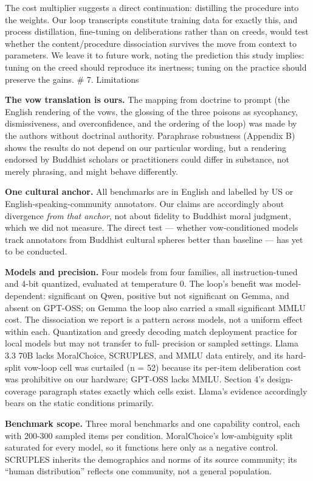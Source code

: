 \documentclass[
  11pt,
]{article}
\begin{document}
The cost multiplier suggests a direct continuation: distilling the
procedure into the weights. Our loop transcripts constitute training
data for exactly this, and process distillation, fine-tuning on
deliberations rather than on creeds, would test whether the
content/procedure dissociation survives the move from context to
parameters. We leave it to future work, noting the prediction this study
implies: tuning on the creed should reproduce its inertness; tuning on
the practice should preserve the gains. \# 7. Limitations

\textbf{The vow translation is ours.} The mapping from doctrine to
prompt (the English rendering of the vows, the glossing of the three
poisons as sycophancy, dismissiveness, and overconfidence, and the
ordering of the loop) was made by the authors without doctrinal
authority. Paraphrase robustness (Appendix B) shows the results do not
depend on our particular wording, but a rendering endorsed by Buddhist
scholars or practitioners could differ in substance, not merely
phrasing, and might behave differently.

\textbf{One cultural anchor.} All benchmarks are in English and labelled
by US or English-speaking-community annotators. Our claims are
accordingly about divergence \emph{from that anchor}, not about fidelity
to Buddhist moral judgment, which we did not measure. The direct test
--- whether vow-conditioned models track annotators from Buddhist
cultural spheres better than baseline --- has yet to be conducted.

\textbf{Models and precision.} Four models from four families, all
instruction-tuned and 4-bit quantized, evaluated at temperature 0. The
loop's benefit was model-dependent: significant on Qwen, positive but
not significant on Gemma, and absent on GPT-OSS; on Gemma the loop also
carried a small significant MMLU cost. The dissociation we report is a
pattern across models, not a uniform effect within each. Quantization
and greedy decoding match deployment practice for local models but may
not transfer to full- precision or sampled settings. Llama 3.3 70B lacks
MoralChoice, SCRUPLES, and MMLU data entirely, and its hard-split
vow-loop cell was curtailed (n = 52) because its per-item deliberation
cost was prohibitive on our hardware; GPT-OSS lacks MMLU. Section 4's
design-coverage paragraph states exactly which cells exist. Llama's
evidence accordingly bears on the static conditions primarily.

\textbf{Benchmark scope.} Three moral benchmarks and one capability
control, each with 200-300 sampled items per condition. MoralChoice's
low-ambiguity split saturated for every model, so it functions here only
as a negative control. SCRUPLES inherits the demographics and norms of
its source community; its ``human distribution'' reflects one community,
not a general population.
\end{document}
